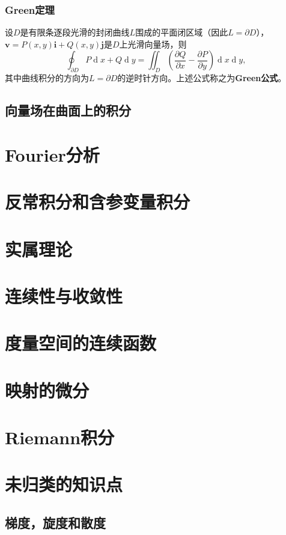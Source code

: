 \documentclass[lang=cn,10pt]{elegantbook}
\newcommand\bv[1]{\boldsymbol{#1}}
\begin{document}
\subsection{Green定理}
\begin{theorem}[(Green)]
    设$D$是有限条逐段光滑的封闭曲线$L$围成的平面闭区域（因此$L = \partial D$），$\bv{v} = P(x,y)\bv{i} + Q(x,y) \bv{j}$是$D$上光滑向量场，则
    \begin{equation}
        \oint_{\partial D}P\operatorname{d}x+Q\operatorname{d}y=\iint_D\left(\frac{\partial Q}{\partial x}-\frac{\partial P}{\partial y}\right)\operatorname{d}x\operatorname{d}y,
    \end{equation}
    其中曲线积分的方向为$L = \partial D$的逆时针方向。上述公式称之为\textbf{Green公式}。
\end{theorem}








\section{向量场在曲面上的积分}



\chapter{Fourier分析}
\chapter{反常积分和含参变量积分}
\chapter{实属理论}

\chapter{连续性与收敛性}
\chapter{度量空间的连续函数}
\chapter{映射的微分}
\chapter{Riemann积分}

\chapter*{未归类的知识点}
\section*{梯度，旋度和散度}
\end{document}
